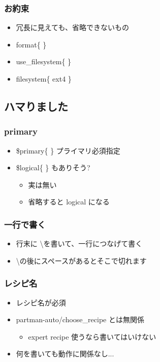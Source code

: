 \documentclass[mingoth,a4paper]{jsarticle}
\begin{document}
\subsubsection{お約束}
\begin{itemize}
\item 冗長に見えても、省略できないもの
\item format\{ \}
\item use\_filesystem\{ \}
\item filesystem\{ ext4 \}
\end{itemize}

\subsection{ハマりました}

\subsubsection{primary}
\begin{itemize}
\item \$primary\{ \} プライマリ必須指定
\item \$logical\{ \} もありそう?
  \begin{itemize}
  \item 実は無い
  \item 省略すると logical になる
  \end{itemize}
\end{itemize}

\subsubsection{一行で書く}
\begin{itemize}
\item 行末に \textbackslash を書いて、一行につなげて書く
\item \textbackslash の後にスペースがあるとそこで切れます
\end{itemize}
 
\subsubsection{レシピ名}
\begin{itemize}
\item レシピ名が必須
\item partman-auto/choose\_recipe とは無関係
  \begin{itemize}
  \item expert recipe 使うなら書いてはいけない
  \end{itemize}
\item 何を書いても動作に関係なし...
\end{itemize}
\end{document}
